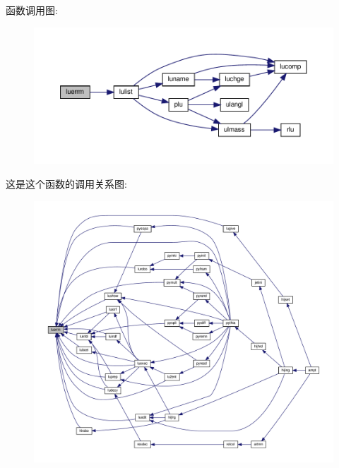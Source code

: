 函数调用图\+:
\nopagebreak
\begin{figure}[H]
\begin{center}
\leavevmode
\includegraphics[width=350pt]{luerrm_8f90_a7644783b7a59f589078818082b42f3eb_cgraph}
\end{center}
\end{figure}
这是这个函数的调用关系图\+:
\nopagebreak
\begin{figure}[H]
\begin{center}
\leavevmode
\includegraphics[width=350pt]{luerrm_8f90_a7644783b7a59f589078818082b42f3eb_icgraph}
\end{center}
\end{figure}
